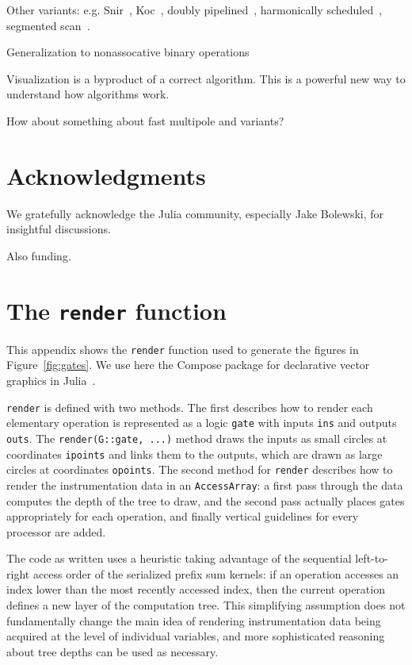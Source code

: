 \documentclass{sig-alternate}
\newcommand{\code}[1]{\texttt{#1}}
\begin{document}
Other variants: e.g. Snir~\cite{Kruskal1985}, Koc~\cite{Egecioglu1992}, doubly pipelined~\cite{Sanders2006}, harmonically scheduled~\cite{Wang1996}, segmented scan~\cite{Sengupta2007}.

Generalization to nonassocative binary operations~\cite{Chen1992}

Visualization is a byproduct of a correct algorithm. This is a powerful new way to understand how algorithms work.

How about something about fast multipole and variants?

\section{Acknowledgments}
We gratefully acknowledge the Julia community, especially Jake Bolewski, for insightful discussions.

Also funding.




\appendix

\section{The \code{render} function}
\label{sec:render}

This appendix shows the \code{render} function used to generate the figures in
Figure~\ref{fig:gates}. We use here the Compose package for declarative vector
graphics in Julia~\cite{Compose.jl}.

\code{render} is defined with two methods. The first describes how to render
each elementary operation is represented as a logic \code{gate} with inputs
\code{ins} and outputs \code{outs}. The \code{render(\allowbreak{}G::gate, ...)} method
draws the inputs as small circles at coordinates \code{ipoints} and links them
to the outputs, which are drawn as large circles at coordinates \code{opoints}.
The second method for \code{render} describes how to render the instrumentation
data in an \code{AccessArray}: a first pass through the data computes the depth
of the tree to draw, and the second pass actually places gates appropriately
for each operation, and finally vertical guidelines for every processor are
added.

The code as written uses a heuristic taking advantage of the sequential
left-to-right access order of the serialized prefix sum kernels: if an
operation accesses an index lower than the most recently accessed index, then
the current operation defines a new layer of the computation tree. This
simplifying assumption does not fundamentally change the main idea of rendering
instrumentation data being acquired at the level of individual variables, and
more sophisticated reasoning about tree depths can be used as necessary.
\end{document}

